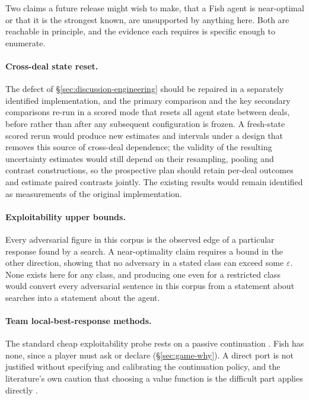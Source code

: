Two claims a future release might wish to make, that a Fish agent is near-optimal or that it is the
strongest known, are unsupported by anything here. Both are reachable in principle, and the evidence
each requires is specific enough to enumerate.

\paragraph{Cross-deal state reset.} The defect of \S\ref{sec:discussion-engineering} should be
repaired in a separately identified implementation, and the primary comparison and the key
secondary comparisons re-run in a scored mode that resets all agent state between deals, before
rather than after any subsequent configuration is frozen. A fresh-state scored rerun would produce
new estimates and intervals under a design that removes this source of cross-deal dependence; the
validity of the resulting uncertainty estimates would still depend on their resampling, pooling and
contrast constructions, so the prospective plan should retain per-deal outcomes and estimate paired
contrasts jointly. The existing results would remain identified as measurements of the original
implementation.

\paragraph{Exploitability upper bounds.} Every adversarial figure in this corpus is the observed
edge of a particular response found by a search. A near-optimality claim requires a bound in the
other direction, showing that no adversary in a stated class can exceed some $\varepsilon$. None
exists here for any class, and producing one even for a restricted class would convert every
adversarial sentence in this corpus from a statement about searches into a statement about the
agent.

\paragraph{Team local-best-response methods.} The standard
cheap exploitability probe rests on a passive continuation \cite{lisy2017lbr}. Fish has none, since a
player must ask or declare (\S\ref{sec:game-why}). A direct port is not justified without
specifying and calibrating the continuation policy, and the literature's own caution that choosing a
value function is the difficult part applies directly \cite{brown2018depthlimited}.

